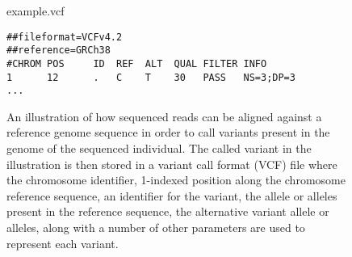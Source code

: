 \begin{figure}[H]
\begin{center}
\vspace{1em}
\small{example.vcf}
\begin{lstlisting}[style=vcf]
##fileformat=VCFv4.2
##reference=GRCh38
#CHROM POS     ID  REF  ALT  QUAL FILTER INFO
1      12      .   C    T    30   PASS   NS=3;DP=3
...
\end{lstlisting}
\caption{
An illustration of how sequenced reads can be aligned against a reference genome sequence in order to call variants present in the genome of the sequenced individual. The called variant in the illustration is then stored in a variant call format (VCF) file where the chromosome identifier, 1-indexed position along the chromosome reference sequence, an identifier for the variant, the allele or alleles present in the reference sequence, the alternative variant allele or alleles, along with a number of other parameters are used to represent each variant.
}
\label{background:variant_and_variant_calling:figures:variant_calling}
\end{center}
\end{figure}

